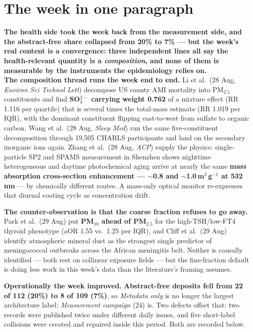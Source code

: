\documentclass[10pt]{article}
\begin{document}
\vspace{6mm}

\section*{\sffamily\bfseries\color{Deep}The week in one paragraph}
\vspace{-1.5mm}{\color{Teal}\rule{\linewidth}{1.1pt}}\vspace{2.5mm}

\begin{keybox}
{\sffamily\bfseries\small\color{Deep}The health side took the week back from the
measurement side, and the abstract-free share collapsed from 20\% to 7\% --- but the
week's real content is a convergence: three independent lines all say the health-relevant
quantity is a \emph{composition}, and none of them is measurable by the instruments the
epidemiology relies on.}\\[1.4mm]
\footnotesize
\textbf{The composition thread runs the week end to end.} Li et al.\ (28 Aug,
\textit{Environ Sci Technol Lett}) decompose US county AMI mortality into PM$_{2.5}$
constituents and find \textbf{SO$_4^{2-}$ carrying weight 0.762} of a mixture effect
(RR 1.116 per quartile) that is several times the total-mass estimate (RR 1.019 per IQR),
with the dominant constituent flipping east-to-west from sulfate to organic carbon. Wang
et al.\ (28 Aug, \textit{Sleep Med}) run the same five-constituent decomposition through
19{,}505 CHARLS participants and land on the secondary inorganic ions again. Zhang et al.\
(28 Aug, \textit{ACP}) supply the physics: single-particle SP2 and SPAMS measurement in
Shenzhen shows nighttime heterogeneous and daytime photochemical aging arrive at nearly
the same \textbf{mass absorption cross-section enhancement --- $\sim$0.8 and
$\sim$1.0\,m$^2$\,g$^{-1}$ at 532\,nm} --- by chemically different routes. A mass-only
optical monitor re-expresses that diurnal coating cycle as concentration drift.

\textbf{The counter-observation is that the coarse fraction refuses to go away.}
Park et al.\ (29 Aug) put \textbf{PM$_{10}$ ahead of PM$_{2.5}$} for the
high-TSH/low-FT4 thyroid phenotype (aOR 1.55 vs.\ 1.25 per IQR), and Cliff et al.\ (29 Aug)
identify atmospheric mineral dust as the strongest single predictor of meningococcal
outbreaks across the African meningitis belt. Neither is causally identified --- both rest
on collinear exposure fields --- but the fine-fraction default is doing less work in this
week's data than the literature's framing assumes.

\textbf{Operationally the week improved.} \textbf{Abstract-free deposits fell from 22 of
112 (20\%) to 8 of 109 (7\%)}, so \textit{Metadata only} is no longer the largest
architecture label; \textit{Measurement campaign} (24) is. Two defects offset that: two
records were published twice under different daily issues, and five short-label
collisions were created and repaired inside this period. Both are recorded below.
\end{keybox}
\end{document}
